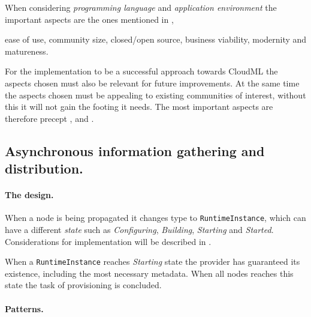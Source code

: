 When considering \emph{programming language} and \emph{application environment} 
the important aspects are the ones mentioned in ,
\begin{ii}
  \iitem ease of use,
  \iitem community size,
  \iitem closed/open source,
  \iitem business viability,
  \iitem modernity and 
  \iitem matureness.
\end{ii}
For the implementation to be a successful approach towards CloudML 
the aspects chosen must also be relevant for future improvements.
At the same time the aspects chosen must be appealing to existing communities of interest,
without this it will not gain the footing it needs.
The most important aspects are therefore precept ,  and .

\subsection{Asynchronous information gathering and distribution.}

\paragraph{The design.}

When a node is being propagated it changes type to 
\texttt{RuntimeInstance}, which can have a different \emph{state} such as 
\emph{Configuring}, \emph{Building}, \emph{Starting} and \emph{Started}.
Considerations for implementation will be described in .

When a \texttt{RuntimeInstance} reaches \emph{Starting} state the provider 
has guaranteed its existence, including the most necessary metadata.
When all nodes reaches this state the task of provisioning is concluded.

\paragraph{Patterns.}

